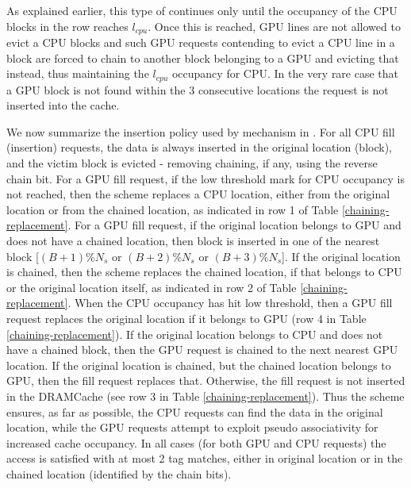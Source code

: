 \par As explained earlier, this type of \chaining continues only until the occupancy of the CPU blocks in the row reaches \textit{$l_{cpu}$}. Once this is reached, GPU lines are not allowed to evict a CPU blocks and such GPU requests contending to evict a CPU line in a block are forced to chain to another block belonging to a GPU and evicting that instead, thus maintaining the \textit{$l_{cpu}$} occupancy for CPU. In the very rare case that a GPU block is not found within the 3 consecutive locations the request is not inserted into the cache.

\par We now summarize the insertion policy used by \chaining mechanism in \cachename. For all CPU fill (insertion) requests, the data is always inserted in the original location (block), and the victim block is evicted - removing chaining, if any, using the reverse chain bit. For a GPU fill request, if the low threshold mark for CPU occupancy is not reached, then the \chaining scheme replaces a CPU location, either from the original location or from the chained location, as indicated in row 1 of Table \ref{chaining-replacement}. For a GPU fill request, if the original location belongs to GPU and does not have a chained location, then block is inserted in one of the nearest block [$(B+1)\%N_s$ or $(B+2)\%N_s$ or $(B+3)\%N_s$]. If the original location is chained, then the scheme replaces the chained location, if that belongs to CPU or the original location itself, as indicated in row 2 of Table \ref{chaining-replacement}. When the CPU occupancy has hit low threshold, then a GPU fill request replaces the original location if it belongs to GPU (row 4 in Table \ref{chaining-replacement}). If the original location belongs to CPU and does not have a chained block, then the GPU request is chained to the next nearest GPU location. If the original location is chained, but the chained location belongs to GPU, then the fill request replaces that. Otherwise, the fill request is not inserted in the DRAMCache (see row 3 in Table \ref{chaining-replacement}). Thus the \chaining scheme ensures, as far as possible, the CPU requests can find the data in the original location, while the GPU requests attempt to exploit pseudo associativity for increased cache occupancy. In all cases (for both GPU and CPU requests) the access is satisfied with at most 2 tag matches, either in original location or in the chained location (identified by the chain bits). 


